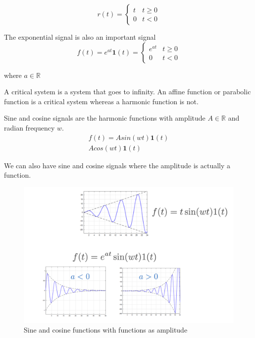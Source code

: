 \documentclass[11pt]{article}
\begin{document}
\begin{equation}
    r(t) = 
  \begin{cases}
    t & t \geq 0 \\ 0 & t < 0
  \end{cases}
\end{equation}

The exponential signal is also an important signal
\begin{equation}
  f(t) = e^{at} \textbf{1} (t) = 
  \begin{cases}
    e^{at} & t \geq 0 \\
    0 & t < 0
  \end{cases}
\end{equation}

where $a \in \mathbb{R}$

A critical system is a system that goes to infinity.
An affine function or parabolic function is a critical system whereas a harmonic function is not.

Sine and cosine signals are the harmonic functions with amplitude $A \in \mathbb{R}$ and radian frequency $w$.
\begin{gather}
  f(t) = A sin(wt) \textbf{1} (t) \\
  A cos (wt) \textbf{1} (t)
\end{gather}

We can also have sine and cosine signals where the amplitude is actually a function. 

\begin{figure}[htbp]
  \centerline{\includegraphics[width=1\textwidth]{../../images/functional_amplitude_harmonic.png}}
  \caption{Sine and cosine functions with functions as amplitude}
  \label{fig:functional_amplitude_harmonic}
\end{figure}
\end{document}
